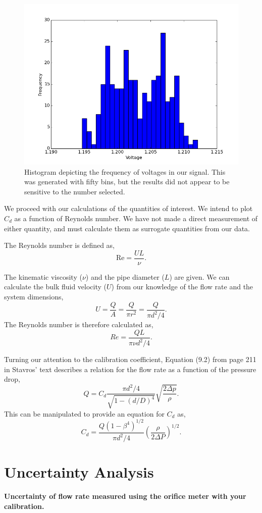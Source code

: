 \documentclass{article}
\begin{document}
  \begin{figure}[!htb]
   \begin{center}
    \includegraphics[width = 12 cm]{figs/oriface_hist.png}
    \caption{Histogram depicting the frequency of voltages in our
    signal. This was generated with fifty bins, but the results did not
    appear to be sensitive to the number selected.}
    \label{oriface-hist}
   \end{center}
  \end{figure}

We proceed with our calculations of the quantities of interest. We
intend to plot $C_d$ as a function of Reynolds number. We have not made
a direct measurement of either quantity, and must calculate them as
surrogate quantities from our data. 

The Reynolds number is defined as, 
\begin{equation}
 \text{Re} = \frac{UL}{\nu}.
\end{equation}

The kinematic viscosity ($\nu$) and the pipe diameter ($L$) are
given. We can calculate the bulk fluid velocity ($U$) from our knowledge
of the flow rate and the system dimensions, 
\begin{equation}
 U = \frac{Q}{A} = \frac{Q}{\pi r^2} = \frac{Q}{\pi d^2/4}.
\end{equation}
The Reynolds number is therefore calculated as,
\begin{equation}
 Re = \frac{Q L}{\pi \nu d^2/4}.
\end{equation}

Turning our attention to the calibration coefficient, Equation (9.2)
from page 211 in Stavros' text describes a relation for  
the flow rate as a function of the pressure drop,  
\begin{equation*}
 Q = C_d \frac{\pi d^2 / 4}{\sqrt{1-(d/D)^4}}\sqrt{\frac{2 \Delta p}{\rho}}.
\end{equation*}
This can be manipulated to provide an equation for $C_d$ as, 
\begin{equation}
 C_d = \frac{Q (1-\beta^4)^{1/2}}{\pi d^2/4} \left(\frac{\rho}{2 \Delta
					      P}\right)^{1/2}.
\end{equation}

\newpage
\section{Uncertainty Analysis}

\textbf{Uncertainty of flow rate measured using the orifice meter with
your calibration.} 

\end{document}
